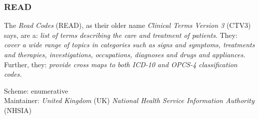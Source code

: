 %
%
%
%
%
%
%

\subsubsection{READ}
\label{read_heading}

The \emph{Read Codes} (READ), as their older name \emph{Clinical Terms Version 3}
(CTV3) says, are a: \textit{list of terms describing the care and treatment of
patients}. They: \textit{cover a wide range of topics in categories such as
signs and symptoms, treatments and therapies, investigations, occupations,
diagnoses and drugs and appliances.} Further, they: \textit{provide cross maps
to both ICD-10 and OPCS-4 classification codes.} \cite{read}

Scheme: enumerative\\
Maintainer: \emph{United Kingdom} (UK)
\emph{National Health Service Information Authority} (NHSIA)

